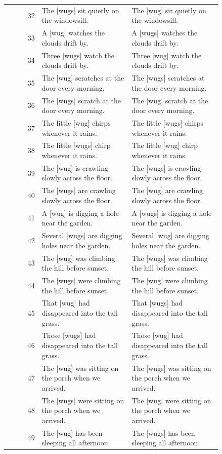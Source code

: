 \begin{longtable}{@{}rp{0.42\linewidth}p{0.42\linewidth}@{}}
32 & The {[}wugs{]} sit quietly on the windowsill. & The {[}wug{]} sit quietly on the windowsill. \\
33 & A {[}wug{]} watches the clouds drift by. & A {[}wugs{]} watches the clouds drift by. \\
34 & Three {[}wugs{]} watch the clouds drift by. & Three {[}wug{]} watch the clouds drift by. \\
35 & The {[}wug{]} scratches at the door every morning. & The {[}wugs{]} scratches at the door every morning. \\
36 & The {[}wugs{]} scratch at the door every morning. & The {[}wug{]} scratch at the door every morning. \\
37 & The little {[}wug{]} chirps whenever it rains. & The little {[}wugs{]} chirps whenever it rains. \\
38 & The little {[}wugs{]} chirp whenever it rains. & The little {[}wug{]} chirp whenever it rains. \\
39 & The {[}wug{]} is crawling slowly across the floor. & The {[}wugs{]} is crawling slowly across the floor. \\
40 & The {[}wugs{]} are crawling slowly across the floor. & The {[}wug{]} are crawling slowly across the floor. \\
41 & A {[}wug{]} is digging a hole near the garden. & A {[}wugs{]} is digging a hole near the garden. \\
42 & Several {[}wugs{]} are digging holes near the garden. & Several {[}wug{]} are digging holes near the garden. \\
43 & The {[}wug{]} was climbing the hill before sunset. & The {[}wugs{]} was climbing the hill before sunset. \\
44 & The {[}wugs{]} were climbing the hill before sunset. & The {[}wug{]} were climbing the hill before sunset. \\
45 & That {[}wug{]} had disappeared into the tall grass. & That {[}wugs{]} had disappeared into the tall grass. \\
46 & Those {[}wugs{]} had disappeared into the tall grass. & Those {[}wug{]} had disappeared into the tall grass. \\
47 & The {[}wug{]} was sitting on the porch when we arrived. & The {[}wugs{]} was sitting on the porch when we arrived. \\
48 & The {[}wugs{]} were sitting on the porch when we arrived. & The {[}wug{]} were sitting on the porch when we arrived. \\
49 & The {[}wug{]} has been sleeping all afternoon. & The {[}wugs{]} has been sleeping all afternoon. \\

\end{longtable}
